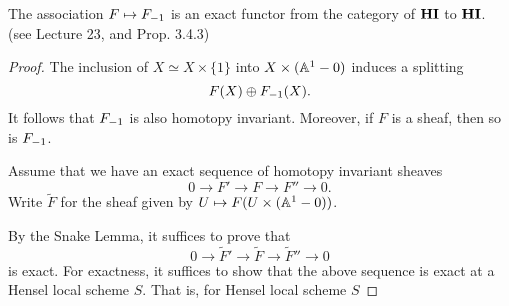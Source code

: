 \begin{prop}\label{prop_contract_is_exact}
The association $F \mapsto F_{-1}$ is an exact functor from
the category of $\mathbf{HI}$ to $\mathbf{HI}$. (see \cite{MVW} Lecture 23, and
\cite{DegGenMot} Prop. 3.4.3)
\end{prop}

\begin{proof}
The inclusion of $X \simeq X \times \{1\}$ into $X \times 
(\mathbb{A}^1 - 0)$ induces a splitting
\[
F(X) \oplus F_{-1}(X).
\]
It follows that $F_{-1}$ is also homotopy invariant. Moreover,
if $F$ is a sheaf, then so is $F_{-1}$.

Assume that we have an exact sequence of homotopy invariant 
sheaves
\[
0 \to F' \to F \to F'' \to 0.
\]
Write $\tilde{F}$ for the sheaf given by $U \mapsto F(U \times 
(\mathbb{A}^1 - 0))$.

By the Snake Lemma, it suffices to prove that
\[
0 \to \tilde{F}' \to \tilde{F} \to \tilde{F}'' \to 0
\]
is exact. For exactness, it suffices to show that the above 
sequence is exact at a Hensel local scheme $S$. That is, for
Hensel local scheme $S$

\end{proof}
